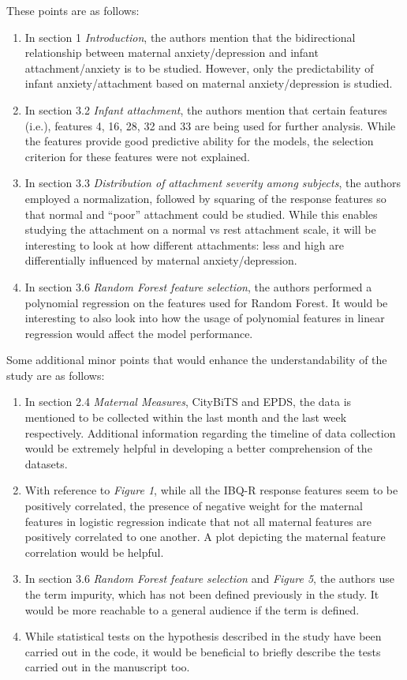\documentclass{article}
\begin{document}
\noindent
These points are as follows:
\begin{enumerate}
	\itemsep0em
	\item In section 1 \textit{Introduction}, the authors mention that the bidirectional relationship between maternal anxiety/depression and infant attachment/anxiety is to be studied. However, only the predictability of infant anxiety/attachment based on maternal anxiety/depression is studied.
	\item In section 3.2 \textit{Infant attachment}, the authors mention that certain features (i.e.), features 4, 16, 28, 32 and 33 are being used for further analysis. While the features provide good predictive ability for the models, the selection criterion for these features were not explained.
	\item In section 3.3 \textit{Distribution of attachment severity among subjects}, the authors employed a normalization, followed by squaring of the response features so that normal and “poor” attachment could be studied. While this enables studying the attachment on a normal vs rest attachment scale, it will be interesting to look at how different attachments: less and high are differentially influenced by maternal anxiety/depression.
	\item In section 3.6 \textit{Random Forest feature selection}, the authors performed a polynomial regression on the features used for Random Forest. It would be interesting to also look into how the usage of polynomial features in linear regression would affect the model performance.
\end{enumerate}

\noindent
Some additional minor points that would enhance the understandability of the study are as follows:
\begin{enumerate}
	\itemsep0em
	\item In section 2.4 \textit{Maternal Measures}, CityBiTS and EPDS, the data is mentioned to be collected within the last month and the last week respectively. Additional information regarding the timeline of data collection would be extremely helpful in developing a better comprehension of the datasets. 
	\item With reference to \textit{Figure 1}, while all the IBQ-R response features seem to be positively correlated, the presence of negative weight for the maternal features in logistic regression indicate that not all maternal features are positively correlated to one another. A plot depicting the maternal feature correlation would be helpful. 
	\item In section 3.6 \textit{Random Forest feature selection} and \textit{Figure 5}, the authors use the term impurity, which has not been defined previously in the study. It would be more reachable to a general audience if the term is defined.
	\item While statistical tests on the hypothesis described in the study have been carried out in the code, it would be beneficial to briefly describe the tests carried out in the manuscript too.
\end{enumerate}
\end{document}
